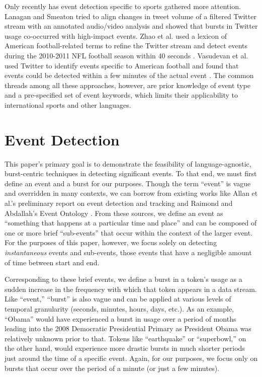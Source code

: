 \documentclass{acm_proc_article-sp}
\begin{document}
{Only recently has event detection specific to sports gathered more attention.
Lanagan and Smeaton tried to align changes in tweet volume of a filtered Twitter stream with an annotated audio/video analysis and showed that bursts in Twitter usage co-occurred with high-impact events\cite{lanagan2011using}.
Zhao et al. used a lexicon of American football-related terms to refine the Twitter stream and detect events during the 2010-2011 NFL football season within 40 seconds \cite{Zhao2011}.
Vasudevan et al. used Twitter to identify events specific to American football and found that events could be detected within a few minutes of the actual event \cite{vasudevan2013twitter}.
The common threads among all these approaches, however, are prior knowledge of event type and a pre-specified set of event keywords, which limits their applicability to international sports and other languages.
}

\section{Event Detection}
\label{sect:methods}

This paper's primary goal is to demonstrate the feasibility of language-agnostic, burst-centric techniques in detecting significant events.
To that end, we must first define an event and a burst for our purposes.
Though the term ``event'' is vague and overridden in many contexts, we can borrow from existing works like Allan et al.'s preliminary report on event detection and tracking and Raimond and Abdallah's Event Ontology \cite{Raimond2007,allan1998line}.
From these sources, we define an event as ``something that happens at a particular time and place'' and can be composed of one or more brief ``sub-events'' that occur within the context of the larger event.
For the purposes of this paper, however, we focus solely on detecting \emph{instantaneous} events and sub-events, those events that have a negligible amount of time between start and end.

Corresponding to these brief events, we define a burst in a token's usage as a sudden increase in the frequency with which that token appears in a data stream.
Like ``event,'' ``burst'' is also vague and can be applied at various levels of temporal granularity (seconds, minutes, hours, days, etc.).
As an example, ``Obama'' would have experienced a burst in usage over a period of months leading into the 2008 Democratic Presidential Primary as President Obama was relatively unknown prior to that. 
Tokens like ``earthquake'' or ``superbowl,'' on the other hand, would experience more drastic bursts in much shorter periods just around the time of a specific event.
Again, for our purposes, we focus only on bursts that occur over the period of a minute (or just a few minutes). 
\end{document}
